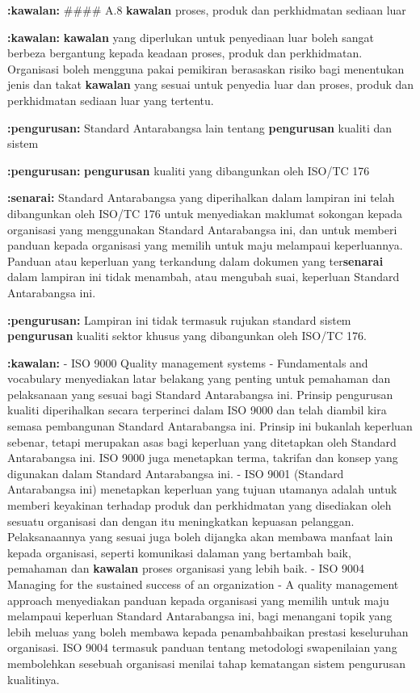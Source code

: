 \documentclass{article}
\begin{document}
\textbf{:kawalan:} \#\#\#\# A.8 \textbf{kawalan} proses, produk dan perkhidmatan sediaan luar

\textbf{:kawalan:} \textbf{kawalan} yang diperlukan untuk penyediaan luar boleh sangat berbeza bergantung kepada
keadaan proses, produk dan perkhidmatan. Organisasi boleh mengguna pakai pemikiran
berasaskan risiko bagi menentukan jenis dan takat \textbf{kawalan} yang sesuai untuk penyedia luar
dan proses, produk dan perkhidmatan sediaan luar yang tertentu.

\textbf{:pengurusan:} Standard Antarabangsa lain tentang \textbf{pengurusan} kualiti dan sistem

\textbf{:pengurusan:} \textbf{pengurusan} kualiti yang dibangunkan oleh ISO/TC 176

\textbf{:senarai:} Standard Antarabangsa yang diperihalkan dalam lampiran ini telah dibangunkan oleh
ISO/TC 176 untuk menyediakan maklumat sokongan kepada organisasi yang menggunakan
Standard Antarabangsa ini, dan untuk memberi panduan kepada organisasi yang memilih
untuk maju melampaui keperluannya. Panduan atau keperluan yang terkandung dalam
dokumen yang ter\textbf{senarai} dalam lampiran ini tidak menambah, atau mengubah suai,
keperluan Standard Antarabangsa ini.

\textbf{:pengurusan:} Lampiran ini tidak termasuk rujukan standard sistem \textbf{pengurusan} kualiti sektor khusus yang
dibangunkan oleh ISO/TC 176.

\textbf{:kawalan:} - ISO 9000 Quality management systems - Fundamentals and vocabulary menyediakan
 latar belakang yang penting untuk pemahaman dan pelaksanaan yang sesuai bagi
 Standard Antarabangsa ini. Prinsip pengurusan kualiti diperihalkan secara terperinci
 dalam ISO 9000 dan telah diambil kira semasa pembangunan Standard Antarabangsa
 ini. Prinsip ini bukanlah keperluan sebenar, tetapi merupakan asas bagi keperluan yang
 ditetapkan oleh Standard Antarabangsa ini. ISO 9000 juga menetapkan terma, takrifan
 dan konsep yang digunakan dalam Standard Antarabangsa ini.
- ISO 9001 (Standard Antarabangsa ini) menetapkan keperluan yang tujuan utamanya
 adalah untuk memberi keyakinan terhadap produk dan perkhidmatan yang disediakan
 oleh sesuatu organisasi dan dengan itu meningkatkan kepuasan pelanggan.
 Pelaksanaannya yang sesuai juga boleh dijangka akan membawa manfaat lain kepada
 organisasi, seperti komunikasi dalaman yang bertambah baik, pemahaman dan \textbf{kawalan}
 proses organisasi yang lebih baik.
- ISO 9004 Managing for the sustained success of an organization - A quality
 management approach menyediakan panduan kepada organisasi yang memilih untuk
 maju melampaui keperluan Standard Antarabangsa ini, bagi menangani topik yang lebih
 meluas yang boleh membawa kepada penambahbaikan prestasi keseluruhan organisasi.
 ISO 9004 termasuk panduan tentang metodologi swapenilaian yang membolehkan
 sesebuah organisasi menilai tahap kematangan sistem pengurusan kualitinya.
\end{document}
